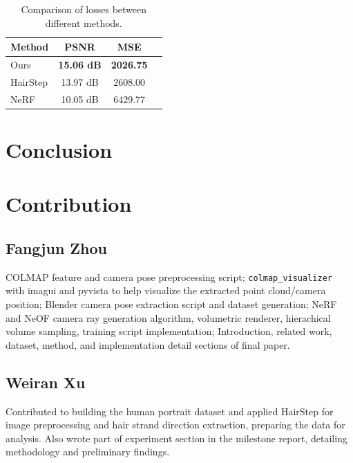 \documentclass{article}
\begin{document}
\begin{table}[h]
\centering
\begin{tabular}{lccc}
\toprule
\textbf{Method} & \textbf{PSNR} & \textbf{MSE} \\ 
\midrule
Ours & \textbf{15.06 dB} & \textbf{2026.75} \\
HairStep & 13.97 dB & 2608.00 \\
NeRF & 10.05 dB & 6429.77 \\
\bottomrule
\end{tabular}
\caption{Comparison of losses between different methods.}
\label{tab:loss_comparison}
\end{table}

\section{Conclusion}



\newpage




\newpage

\section{Contribution}

\subsection{Fangjun Zhou}

COLMAP feature and camera pose preprocessing script; \texttt{colmap\_visualizer} with imagui and pyvista to help visualize the extracted point cloud/camera position; Blender camera pose extraction script and dataset generation; NeRF and NeOF camera ray generation algorithm, volumetric renderer, hierachical volume sampling, training script implementation; Introduction, related work, dataset, method, and implementation detail sections of final paper.

\subsection{Weiran Xu}

Contributed to building the human portrait dataset and applied HairStep for image preprocessing and hair strand direction extraction, preparing the data for analysis. Also wrote part of experiment section in the milestone report, detailing methodology and preliminary findings.
\end{document}
